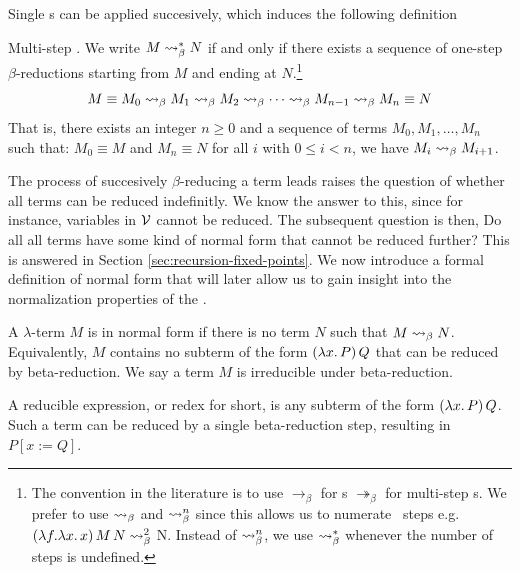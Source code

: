 Single \bred s can be applied succesively, which induces the following definition
\begin{definition}
  \label{def:multi-step-beta-reduction}
  Multi-step \bred. We write $M \mathrel{\leadsto}_\beta^* N$ if and only if there exists a sequence of one-step $\beta$-reductions starting from $M$ and ending at $N$.\footnote{The convention in the literature is to use $\rightarrow_\beta$ for \bred s $\twoheadrightarrow_\beta$ for multi-step \bred s. We prefer to use $\mathrel{\leadsto}_\beta$ and $\mathrel{\leadsto}_\beta^n$ since this allows us to numerate \bred \ steps e.g. $ (\lambda f. \lambda x . \, x) \, M \, N \mathrel{\leadsto}_\beta^2 $ N. Instead of $\mathrel{\leadsto}_\beta^n$, we use $\mathrel{\leadsto}_\beta^*$ whenever the number of steps is undefined.}
  \label{def:zero-more-bred}
  \[
    M \equiv M_0 \mathrel{\leadsto}_\beta M_1 \mathrel{\leadsto}_\beta M_2 \mathrel{\leadsto}_\beta \cdots \mathrel{\leadsto}_\beta M_{n-1} \mathrel{\leadsto}_\beta M_n \equiv N
  \]
  That is, there exists an integer $n \geq 0$ and a sequence of terms $M_0, M_1, \dots, M_n$ such that: $ M_0 \equiv M $ and $ M_n \equiv N $ for all $ i $ with $ 0 \leq i < n $, we have $ M_i \mathrel{\leadsto}_\beta M_{i+1} $.
\end{definition}
The process of succesively $\beta$-reducing a term leads raises the question of whether all terms can be reduced indefinitly. We know the answer to this, since for instance, variables in $\mathcal{V}$ cannot be reduced. The subsequent question is then, Do all all terms have some kind of normal form that cannot be reduced further? This is answered in Section \ref{sec:recursion-fixed-points}. We now introduce a formal definition of normal form that will later allow us to gain insight into the normalization properties of the \lcalc.

\begin{definition} A \(\lambda\)-term \(M\) is in normal form if there is no term \(N\) such that \( M \mathrel{\leadsto}_\beta N \). Equivalently, \(M\) contains no subterm of the form \( (\lambda x . \, P) \, Q \) that can be reduced by beta-reduction. We say a term \(M\) is irreducible under beta-reduction.
\end{definition}

\begin{definition}
  A reducible expression, or redex for short, is any subterm of the form 
  \( (\lambda x . \, P) \, Q \). Such a term can be reduced by a single beta-reduction step, resulting in \( P[x := Q] \).
\end{definition}

